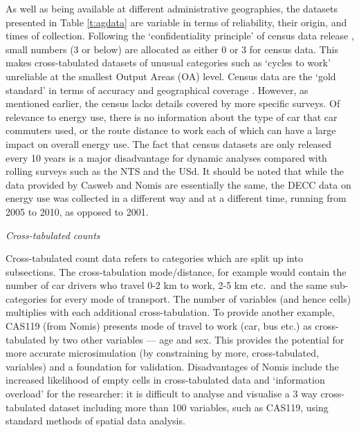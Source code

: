 As well as being available at different administrative geographies, the datasets
presented in Table \ref{t:agdata} are variable in terms of reliability, their
origin, and times of collection.
Following the `confidentiality principle' of
census data release \citep{Rees2002}, small numbers (3 or below) are allocated
as either 0 or 3 for census data.
This makes cross-tabulated datasets of unusual categories such as `cycles to
work' unreliable at the smallest Output Areas (OA) level.
Census data are the `gold standard' in terms of accuracy
and geographical coverage \citep[p.~4]{Martin2002}.
However, as mentioned earlier, the census lacks details covered by more
specific surveys. Of relevance to energy use, there is no information about the
type of car that car commuters used, or the route distance to work each of
which can have a large impact on overall energy use. The fact that census datasets
are only released every 10 years is a major disadvantage for dynamic analyses
compared with rolling surveys such as the NTS and the USd. It should be noted
that while the data provided by Casweb and Nomis are essentially the same,
the DECC data on energy use was collected in a different way and at a different
time, running from 2005 to 2010, as opposed to 2001.

\emph{Cross-tabulated counts}

Cross-tabulated count data refers to categories which are split up into
subsections. The cross-tabulation mode/distance, for example would contain the
number of car drivers who travel 0-2 km to work, 2-5 km etc.~and the same
sub-categories for every mode of transport. The number of variables (and hence
cells) multiplies with each additional cross-tabulation. To provide another
example, CAS119 (from Nomis) presents mode of travel to work (car, bus etc.) as
cross-tabulated by two other variables --- age and sex.
This provides the potential for more accurate microsimulation (by constraining
by more, cross-tabulated, variables) and a foundation for
validation. Disadvantages of Nomis include the increased likelihood of
empty cells in cross-tabulated data
and `information overload' for the researcher: it is difficult to analyse and
visualise a 3 way cross-tabulated dataset including more than 100 variables,
such as CAS119, using standard methods of spatial data analysis.

